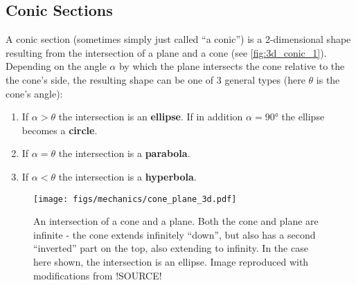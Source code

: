 \subsection{Conic Sections}
A conic section (sometimes simply just called \enquote{a conic}) is a 2-dimensional shape resulting from the intersection of a plane and a cone (see \autoref{fig:3d_conic_1}). Depending on the angle $\alpha$ by which the plane intersects the cone relative to the the cone's side, the resulting shape can be one of 3 general types (here $\theta$ is the cone's angle):
\begin{enumerate}
	\item If $\alpha>\theta$ the intersection is an \textbf{ellipse}. If in addition $\alpha=\ang{90}$ the ellipse becomes a \textbf{circle}.
	\item If $\alpha=\theta$ the intersection is a \textbf{parabola}.
	\item If $\alpha<\theta$ the intersection is a \textbf{hyperbola}.
\end{enumerate}

\begin{figure}
	\begin{center}
		\texttt{[image: figs/mechanics/cone\_plane\_3d.pdf]}
	\end{center}
	\caption{An intersection of a cone and a plane. Both the cone and plane are infinite - the cone extends infinitely \enquote{down}, but also has a second \enquote{inverted} part on the top, also extending to infinity. In the case here shown, the intersection is an ellipse. Image reproduced with modifications from !SOURCE!} %
	\label{fig:3d_conic_1}
\end{figure}


